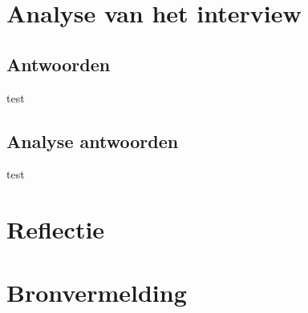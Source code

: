 \documentclass[]{article}
\begin{document}
\section{Analyse van het interview}

\subsection{Antwoorden}
test
\subsection{Analyse antwoorden}
test

\section{Reflectie}

\section{Bronvermelding}
\printbibliography
\end{document}

